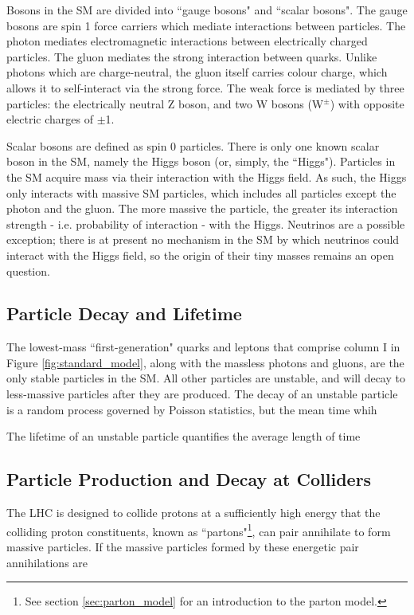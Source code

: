 Bosons in the SM are divided into ``gauge bosons" and ``scalar bosons". The gauge bosons are spin 1 force carriers which mediate interactions between particles. The photon mediates electromagnetic interactions between electrically charged particles. The gluon mediates the strong interaction between quarks. Unlike photons which are charge-neutral, the gluon itself carries colour charge, which allows it to self-interact via the strong force. The weak force is mediated by three particles: the electrically neutral Z boson, and two W bosons (W$^\pm$) with opposite electric charges of $\pm$1. 

Scalar bosons are defined as spin 0 particles. There is only one known scalar boson in the SM, namely the Higgs boson (or, simply, the ``Higgs"). Particles in the SM acquire mass via their interaction with the Higgs field. As such, the Higgs only interacts with massive SM particles, which includes all particles except the photon and the gluon. The more massive the particle, the greater its interaction strength - i.e. probability of interaction - with the Higgs. Neutrinos are a possible exception; there is at present no mechanism in the SM by which neutrinos could interact with the Higgs field, so the origin of their tiny masses remains an open question.  

\subsection{Particle Decay and Lifetime}

The lowest-mass ``first-generation" quarks and leptons that comprise column I in Figure \ref{fig:standard_model}, along with the massless photons and gluons, are the only stable particles in the SM. All other particles are unstable, and will decay to less-massive particles after they are produced. The decay of an unstable particle is a random process governed by Poisson statistics, but the mean time whih

The lifetime of an unstable particle quantifies the average length of time 

\subsection{Particle Production and Decay at Colliders}

The LHC is designed to collide protons at a sufficiently high energy that the colliding proton constituents, known as ``partons"\footnote{See section \ref{sec:parton_model} for an introduction to the parton model.}, can pair annihilate to form massive particles. If the massive particles formed by these energetic pair annihilations are 

